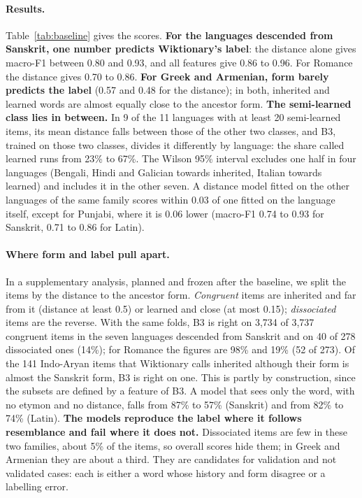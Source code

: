 \documentclass[11pt]{article}
\begin{document}
\paragraph{Results.} Table~\ref{tab:baseline} gives the scores. \textbf{For the languages descended from Sanskrit, one number predicts Wiktionary's label}: the distance alone gives macro-F1 between 0.80 and 0.93, and all features give 0.86 to 0.96. For Romance the distance gives 0.70 to 0.86. \textbf{For Greek and Armenian, form barely predicts the label} (0.57 and 0.48 for the distance); in both, inherited and learned words are almost equally close to the ancestor form. \textbf{The semi-learned class lies in between.} In 9 of the 11 languages with at least 20 semi-learned items, its mean distance falls between those of the other two classes, and B3, trained on those two classes, divides it differently by language: the share called learned runs from 23\% to 67\%. The Wilson 95\% interval excludes one half in four languages (Bengali, Hindi and Galician towards inherited, Italian towards learned) and includes it in the other seven. A distance model fitted on the other languages of the same family scores within 0.03 of one fitted on the language itself, except for Punjabi, where it is 0.06 lower (macro-F1 0.74 to 0.93 for Sanskrit, 0.71 to 0.86 for Latin).

\paragraph{Where form and label pull apart.} In a supplementary analysis, planned and frozen after the baseline, we split the items by the distance to the ancestor form. \textit{Congruent} items are inherited and far from it (distance at least 0.5) or learned and close (at most 0.15); \textit{dissociated} items are the reverse. With the same folds, B3 is right on 3,734 of 3,737 congruent items in the seven languages descended from Sanskrit and on 40 of 278 dissociated ones (14\%); for Romance the figures are 98\% and 19\% (52 of 273). Of the 141 Indo-Aryan items that Wiktionary calls inherited although their form is almost the Sanskrit form, B3 is right on one. This is partly by construction, since the subsets are defined by a feature of B3. A model that sees only the word, with no etymon and no distance, falls from 87\% to 57\% (Sanskrit) and from 82\% to 74\% (Latin). \textbf{The models reproduce the label where it follows resemblance and fail where it does not.} Dissociated items are few in these two families, about 5\% of the items, so overall scores hide them; in Greek and Armenian they are about a third. They are candidates for validation and not validated cases: each is either a word whose history and form disagree or a labelling error.
\end{document}
